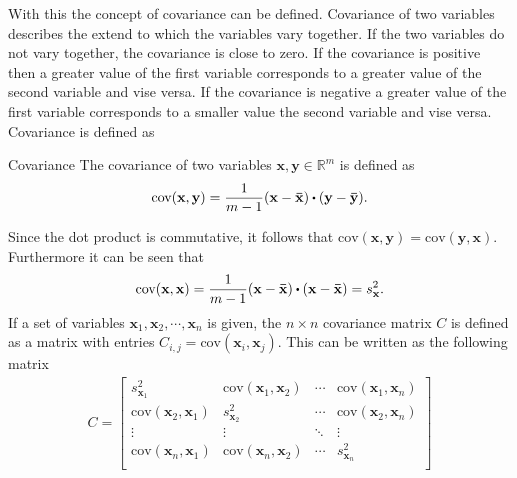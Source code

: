 With this the concept of covariance can be defined.
Covariance of two variables describes the extend to which the variables vary together. If the two variables do not vary together, the covariance is close to zero. If the covariance is positive then a greater value of the first variable corresponds to a greater value of the second variable and vise versa. If the covariance is negative a greater value of the first variable corresponds to a smaller value the second variable and vise versa. Covariance is defined as 
\begin{definition}{Covariance}
    The covariance of two variables $\textbf{x}, \textbf{y}\in \mathbb{R}^m$ is defined as
    \begin{align*}
        \text{cov}(\textbf{x},\textbf{y})=\frac{1}{m-1}(\mathbf{x}-\mathbf{\Bar{x}}) \vprik (\mathbf{y}-\mathbf{\Bar{y}}).
    \end{align*}
    \cite[475]{LiAl}
\end{definition}
Since the dot product is commutative, it follows that $\text{cov}(\textbf{x},\textbf{y})=\text{cov}(\textbf{y},\textbf{x})$. Furthermore it can be seen that
\begin{align*}
    \text{cov}(\textbf{x},\textbf{x})=\frac{1}{m-1}(\mathbf{x}-\mathbf{\Bar{x}}) \vprik (\mathbf{x}-\mathbf{\Bar{x}})=s^2_{\textbf{x}}.
\end{align*}
If a set of variables $\textbf{x}_1,\textbf{x}_2, \cdots, \textbf{x}_n$ is given, the $n\times n$ covariance matrix $C$ is defined as a matrix with entries $C_{i,j}=\text{cov}(\textbf{x}_i,\textbf{x}_j)$. This can be written as the following matrix
\begin{align*}
    C=
    \begin{bmatrix}
        s_{\textbf{x}_1}^2 & \text{cov}(\textbf{x}_1,\textbf{x}_2) & \cdots & \text{cov}(\textbf{x}_1,\textbf{x}_n)\\
         \text{cov}(\textbf{x}_2,\textbf{x}_1)
         & s_{\textbf{x}_2}^2 &  \cdots &\text{cov}(\textbf{x}_2,\textbf{x}_n)\\
         \vdots & \vdots & \ddots & \vdots \\
          \text{cov}(\textbf{x}_n,\textbf{x}_1)  & \text{cov}(\textbf{x}_n,\textbf{x}_2) & \cdots & s_{\textbf{x}_n}^2\\
    \end{bmatrix}
\end{align*}
\cite[475]{LiAl}
